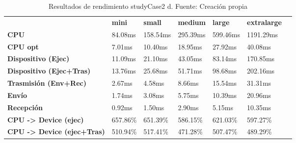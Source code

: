 \begin{table}[H]
    \centering
    \begin{tabular}{lllllll}
    \rowcolor[HTML]{DAE8FC} \ &  \textbf{mini} &  \textbf{small} &  \textbf{medium} &  \textbf{	large} &  \textbf{	extralarge} \\
    \cellcolor[HTML]{DAE8FC} \textbf{CPU} & 84.08ms & 158.54ms & 295.39ms & 	599.46ms & 	1191.29ms \\
    \rowcolor[HTML]{EFEFEF} \cellcolor[HTML]{DAE8FC} \textbf{CPU opt} & 7.01ms & 10.40ms & 18.95ms & 	27.92ms & 	40.08ms \\
    \cellcolor[HTML]{DAE8FC} \textbf{Dispositivo (Ejec)} & 11.09ms & 21.10ms & 43.05ms & 	83.14ms & 	170.85ms \\
    \rowcolor[HTML]{EFEFEF} \cellcolor[HTML]{DAE8FC} \textbf{Dispositivo (Ejec+Tras)} & 13.76ms & 25.68ms & 51.71ms & 	98.68ms & 	202.16ms \\
    \cellcolor[HTML]{DAE8FC} \textbf{Trasmisión (Env+Rec)} & 2.67ms & 4.58ms & 8.66ms & 	15.54ms & 	31.31ms \\
    \rowcolor[HTML]{EFEFEF} \cellcolor[HTML]{DAE8FC} \textbf{Envío} & 1.74ms & 3.08ms & 5.75ms & 	10.39ms & 	20.96ms \\
    \cellcolor[HTML]{DAE8FC} \textbf{Recepción} & 0.92ms & 1.50ms & 2.90ms & 	5.15ms & 	10.35ms \\
    \rowcolor[HTML]{EFEFEF} \cellcolor[HTML]{DAE8FC} \textbf{CPU -> Device (ejec)} & 657.86\% & 651.39\% & 586.15\% & 	621.03\% & 	597.27\% \\
    \cellcolor[HTML]{DAE8FC} \textbf{CPU -> Device (ejec+Tras)} & 510.94\% & 517.41\% & 471.28\% & 	507.47\% & 	489.29\% \\
    \end{tabular}
    \caption[Resultados de rendimiento studyCase2 d]{{Resultados de rendimiento studyCase2 d. Fuente: Creación propia}}
    \label{table_test_studyCase2_d_hw_performanceResults}
\end{table}